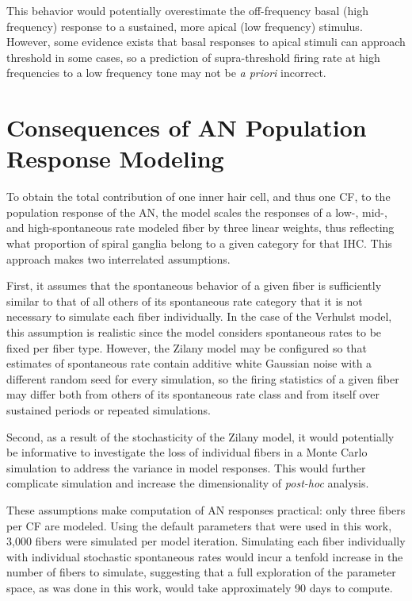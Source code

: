 This behavior would potentially overestimate the off-frequency basal (high frequency) response to a sustained, more apical (low frequency) stimulus.  However, some evidence exists \citep{Kiang1974Tails,Yates1990Basilar} that basal responses to apical stimuli can approach threshold in some cases, so a prediction of supra-threshold firing rate at high frequencies to a low frequency tone may not be \emph{a priori} incorrect.

\section{Consequences of AN Population Response Modeling} %
\label{sec:consequences_of_percentage_weighting_degradation_for_synaptopathy}
To obtain the total contribution of one inner hair cell, and thus one CF, to the population response of the AN, the model scales the responses of a low-, mid-, and high-spontaneous rate modeled fiber by three linear weights, thus reflecting what proportion of spiral ganglia belong to a given category for that IHC.  This approach makes two interrelated assumptions.  

First, it assumes that the spontaneous behavior of a given fiber is sufficiently similar to that of all others of its spontaneous rate category that it is not necessary to simulate each fiber individually.  In the case of the Verhulst model, this assumption is realistic since the model considers spontaneous rates to be fixed per fiber type.  However, the Zilany model may be configured so that estimates of spontaneous rate contain additive white Gaussian noise with a different random seed for every simulation, so the firing statistics of a given fiber may differ both from others of its spontaneous rate class and from itself over sustained periods or repeated simulations.

Second, as a result of the stochasticity of the Zilany model, it would potentially be informative to investigate the loss of individual fibers in a Monte Carlo simulation to address the variance in model responses.  This would further complicate simulation and increase the dimensionality of \emph{post-hoc} analysis. 

These assumptions make computation of AN responses practical: only three fibers per CF are modeled.  Using the default parameters that were used in this work, 3,000 fibers were simulated per model iteration.  Simulating each fiber individually with individual stochastic spontaneous rates would incur a tenfold increase in the number of fibers to simulate, suggesting that a full exploration of the parameter space, as was done in this work, would take approximately 90 days to compute.

